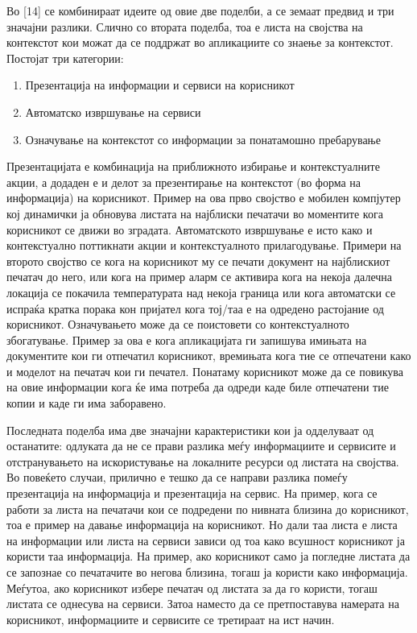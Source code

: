 Во [14] се комбинираат идеите од овие две поделби, а се земаат предвид и три
значајни разлики. Слично со втората поделба, тоа е листа на својства на
контекстот кои можат да се поддржат во апликациите со знаење за контекстот.
Постојат три категории: 

\begin{enumerate}
  \item Презентација на информации и сервиси на корисникот
  \item Автоматско извршување на сервиси
  \item Означување на контекстот со информации за понатамошно пребарување
\end{enumerate}

Презентацијата е комбинација на приближното избирање и контекстуалните акции, а
додаден е и делот за презентирање на контекстот (во форма на информација) на
корисникот. Пример на ова прво својство е мобилен компјутер кој динамички ја
обновува листата на најблиски печатачи во моментите кога корисникот се движи во
зградата. Автоматското извршување е исто како и контекстуално поттикнати акции и
контекстуалното прилагодување. Примери на второто својство се кога на корисникот
му се печати документ на најблискиот печатач до него, или кога на пример аларм
се активира кога на некоја далечна локација се покачила температурата над некоја
граница или кога автоматски се испраќа кратка порака кон пријател кога тој/таа е
на одредено растојание од корисникот. Означувањето може да се поистовети со
контекстуалното збогатување. Пример за ова е кога апликацијата ги запишува
имињата на документите кои ги отпечатил корисникот, времињата кога тие се
отпечатени како и моделот на печатач кои ги печател. Понатаму корисникот може да
се повикува на овие информации кога ќе има потреба да одреди каде биле
отпечатени тие копии и каде ги има заборавено.

Последната поделба има две значајни карактеристики кои ја одделуваат од
останатите: одлуката да не се прави разлика меѓу информациите и сервисите и
отстранувањето на искористување на локалните ресурси од листата на својства. Во
повеќето случаи, прилично е тешко да се направи разлика помеѓу презентација на
информација и презентација на сервис. На пример, кога се работи за листа на
печатачи кои се подредени по нивната близина до корисникот, тоа е пример на
давање информација на корисникот. Но дали таа листа е листа на информации или
листа на сервиси зависи од тоа како всушност корисникот ја користи таа
информација. На пример, ако корисникот само ја погледне листата да се запознае
со печатачите во негова близина, тогаш ја користи како информација. Меѓутоа, ако
корисникот избере печатач од листата за да го користи, тогаш листата се однесува
на сервиси. Затоа наместо да се претпоставува намерата на корисникот,
информациите и сервисите се третираат на ист начин.

